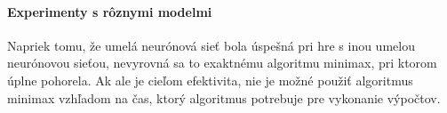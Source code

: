 \paragraph{Experimenty s rôznymi modelmi}

Napriek tomu, že umelá neurónová sieť bola úspešná pri hre s inou umelou neurónovou sieťou, nevyrovná sa to exaktnému
algoritmu minimax, pri ktorom úplne pohorela.
Ak ale je cieľom efektivita, nie je možné použiť algoritmus minimax vzhľadom na čas, ktorý algoritmus potrebuje pre
vykonanie výpočtov.
